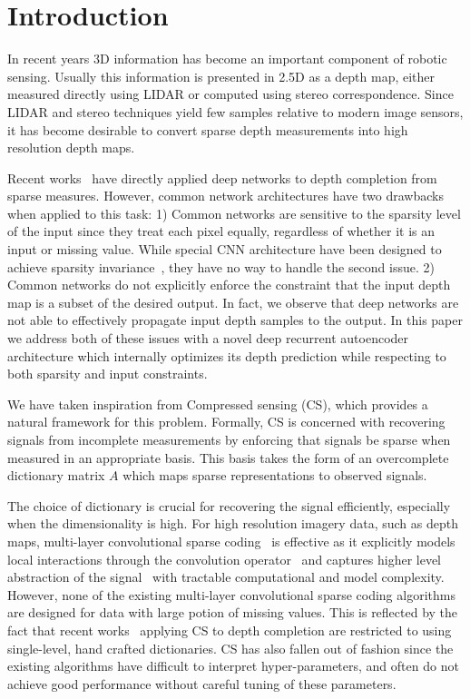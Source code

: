 \section{Introduction}
In recent years 3D information has become an important component of robotic sensing. Usually this information is presented in 2.5D as a depth map, either measured directly using LIDAR or computed using stereo correspondence. Since LIDAR and stereo techniques yield few samples relative to modern image sensors, it has become desirable to convert sparse depth measurements into high resolution depth maps.


Recent works~\cite{} have directly applied deep networks to depth completion from sparse measures. However, common network architectures have two drawbacks when applied to this task: 1) Common networks are sensitive to the sparsity level of the input since they treat each pixel equally, regardless of whether it is an input or missing value. While special CNN architecture have been designed to achieve sparsity invariance~\cite{}, they have no way to handle the second issue. 2) Common networks do not explicitly enforce the constraint that the input depth map is a subset of the desired output. In fact, we observe that deep networks are not able to effectively propagate input depth samples to the output. In this paper we address both of these issues with a novel deep recurrent autoencoder architecture which internally optimizes its depth prediction while respecting to both sparsity and input constraints.


We have taken inspiration from Compressed sensing (CS), which provides a natural framework for this problem. Formally, CS is concerned with recovering signals from incomplete measurements by enforcing that signals be sparse when measured in an appropriate basis. This basis takes the form of an overcomplete dictionary matrix $A$ which maps sparse representations to observed signals.

The choice of dictionary is crucial for recovering the signal efficiently, especially when the dimensionality is high. For high resolution imagery data, such as depth maps, multi-layer convolutional sparse coding~\cite{} is effective as it explicitly models local interactions through the convolution operator~\cite{} and captures higher level abstraction of the signal~\cite{} with tractable computational and model complexity. However, none of the existing multi-layer convolutional sparse coding algorithms are designed for data with large potion of missing values. This is reflected by the fact that recent works~\cite{} applying CS to depth completion are restricted to using single-level, hand crafted dictionaries. CS has also fallen out of fashion since the existing algorithms have difficult to interpret hyper-parameters, and often do not achieve good performance without careful tuning of these parameters.

